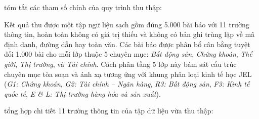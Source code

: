  tóm tắt các tham số chính của quy trình thu thập:

\begin{table}[H]
  \centering
  \caption{Cấu hình tham số thực thi của quy trình thu thập dữ liệu văn bản.}
  \label{tab:text_crawler_config}
\end{table}

Kết quả thu được một tập ngữ liệu sạch gồm đúng 5.000 bài báo với 11 trường thông tin, hoàn toàn không có giá trị thiếu và không có bản ghi trùng lặp về mã định danh, đường dẫn hay toàn văn. Các bài báo được phân bổ cân bằng tuyệt đối 1.000 bài cho mỗi lớp thuộc 5 chuyên mục: \textit{Bất động sản}, \textit{Chứng khoán}, \textit{Thế giới}, \textit{Thị trường}, và \textit{Tài chính}. Cách phân tầng 5 lớp này bám sát cấu trúc chuyên mục tòa soạn và ánh xạ tương ứng với khung phân loại kinh tế học JEL (\textit{G1: Chứng khoán}, \textit{G2: Tài chính -- Ngân hàng}, \textit{R3: Bất động sản}, \textit{F3: Kinh tế quốc tế}, \textit{E \& L: Thị trường hàng hóa và sản xuất}).

 tổng hợp chi tiết 11 trường thông tin của tập dữ liệu vừa thu thập:


